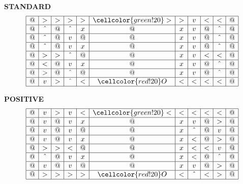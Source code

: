 \documentclass{article}
\begin{document}
\begin{center}
	\small \textbf{STANDARD}
	\[
		\begin{array}{|c|c|c|c|c|c|c|c|c|c|c|c|}
			\hline
			@ & >      & > & >      & > & \cellcolor{green!20}> & > & v & < & <      & @ \\ \hline
			@ & \hat{} & @ & \hat{} & x & @                     & x & v & @ & \hat{} & @ \\ \hline
			@ & \hat{} & @ & v      & @ & @                     & x & v & @ & \hat{} & @ \\ \hline
			@ & \hat{} & @ & v      & x & @                     & x & v & @ & \hat{} & @ \\ \hline
			@ & >      & > & \hat{} & @ & @                     & x & v & < & <      & @ \\ \hline
			@ & <      & @ & v      & x & @                     & x & v & @ & \hat{} & @ \\ \hline
			@ & >      & @ & \hat{} & @ & @                     & x & v & @ & \hat{} & @ \\ \hline
			@ & v      & > & \hat{} & < & \cellcolor{red!20}O   & < & < & < & <      & @ \\ \hline
		\end{array}
	\]
\end{center}


\small \textbf{POSITIVE}
\[
	\begin{array}{|c|c|c|c|c|c|c|c|c|c|c|c|}
		\hline
		@ & v      & > & v & < & \cellcolor{green!20}< & < & <      & < & <      & @ \\ \hline
		@ & v      & @ & v & x & @                     & x & v      & @ & >      & @ \\ \hline
		@ & v      & @ & v & @ & @                     & x & \hat{} & @ & v      & @ \\ \hline
		@ & v      & @ & v & x & @                     & x & <      & @ & >      & @ \\ \hline
		@ & >      & > & < & @ & @                     & x & <      & < & v      & @ \\ \hline
		@ & \hat{} & @ & v & x & @                     & x & <      & @ & \hat{} & @ \\ \hline
		@ & v      & @ & v & @ & @                     & x & v      & @ & >      & @ \\ \hline
		@ & >      & > & > & > & \cellcolor{red!20}O   & < & \hat{} & < & >      & @ \\ \hline
	\end{array}
\]
\end{document}
